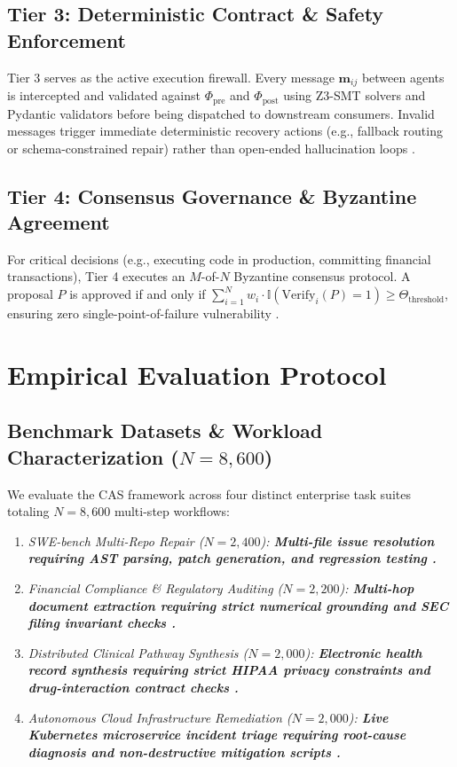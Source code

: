 \documentclass[10pt,twocolumn,letterpaper]{article}
\begin{document}
\subsection{Tier 3: Deterministic Contract \& Safety Enforcement}

Tier 3 serves as the active execution firewall. Every message $\mathbf{m}_{ij}$ between agents is intercepted and validated against $\Phi_{\text{pre}}$ and $\Phi_{\text{post}}$ using Z3-SMT solvers and Pydantic validators before being dispatched to downstream consumers. Invalid messages trigger immediate deterministic recovery actions (e.g., fallback routing or schema-constrained repair) rather than open-ended hallucination loops \cite{arxiv_2404_01131}.


\subsection{Tier 4: Consensus Governance \& Byzantine Agreement}

For critical decisions (e.g., executing code in production, committing financial transactions), Tier 4 executes an $M$-of-$N$ Byzantine consensus protocol. A proposal $P$ is approved if and only if $\sum_{i=1}^N w_i \cdot \mathbb{I}(\text{Verify}_i(P) = 1) \ge \Theta_{\text{threshold}}$, ensuring zero single-point-of-failure vulnerability \cite{crossref_10_1109_access_2026_3656309}.




\section{Empirical Evaluation Protocol}



\subsection{Benchmark Datasets \& Workload Characterization ($N = 8,600$)}


We evaluate the CAS framework across four distinct enterprise task suites totaling $N = 8,600$ multi-step workflows:
\begin{enumerate}
  \item \textit{SWE-bench Multi-Repo Repair ($N = 2,400$):\textbf{ Multi-file issue resolution requiring AST parsing, patch generation, and regression testing \cite{arxiv_2405_01543}.}}
  \item \textit{Financial Compliance \& Regulatory Auditing ($N = 2,200$):\textbf{ Multi-hop document extraction requiring strict numerical grounding and SEC filing invariant checks \cite{arxiv_2501_02497}.}}
  \item \textit{Distributed Clinical Pathway Synthesis ($N = 2,000$):\textbf{ Electronic health record synthesis requiring strict HIPAA privacy constraints and drug-interaction contract checks \cite{crossref_10_1201_9788743808145_14}.}}
  \item \textit{Autonomous Cloud Infrastructure Remediation ($N = 2,000$):\textbf{ Live Kubernetes microservice incident triage requiring root-cause diagnosis and non-destructive mitigation scripts \cite{arxiv_2406_00584}.}}
\end{enumerate}
\end{document}
